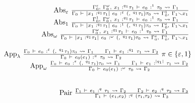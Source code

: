 \[\begin{array}{r}
{\text{Abs}_{\varepsilon}\ \frac{\text{\quad\quad}{\Gamma_{0}^{\varepsilon}{,\ }\Gamma_{0}^{\omega}{,\ }{x_{1}\text{ :}^{q_{1}}\tau_{1}}\  \vdash \ e_{0}\ :^{1}\ \tau_{0}\  \rightsquigarrow \ \Gamma_{1}}}{\Gamma_{0}\  \vdash \ {|{x_{1}\text{ :}^{q_{1}}\tau_{1}}|\ e_{0}}\ :^{\varepsilon}\ {({,\ }{{}^{q_{1}}\tau_{1}})\tau_{0}}\  \rightsquigarrow \ \Gamma_{0}^{1}{,\ }\Gamma_{1} \smallsetminus x_{1}}\ } \\
{\text{Abs}_{1}\ \frac{\text{\quad\quad}{\Gamma_{0}^{1}{,\ }\Gamma_{0}^{\omega}{,\ }{x_{1}\text{ :}^{q_{1}}\tau_{1}}\  \vdash \ e_{0}\ :^{1}\ \tau_{0}\  \rightsquigarrow \ \Gamma_{1}}}{\Gamma_{0}\  \vdash \ {|{x_{1}\text{ :}^{q_{1}}\tau_{1}}|\ e_{0}}\ :^{1}\ {({,\ }{{}^{q_{1}}\tau_{1}})\tau_{0}}\  \rightsquigarrow \ \Gamma_{0}^{\varepsilon}{,\ }\Gamma_{1} \smallsetminus x_{1}}\ } \\
{\text{Abs}_{\omega}\ \frac{\text{\quad\quad}{\Gamma_{0}^{\omega}{,\ }{x_{1}\text{ :}^{q_{1}}\tau_{1}}\  \vdash \ e_{0}\ :^{1}\ \tau_{0}\  \rightsquigarrow \ \Gamma_{1}}}{\Gamma_{0}\  \vdash \ {|{x_{1}\text{ :}^{q_{1}}\tau_{1}}|\ e_{0}}\ :^{\omega}\ {({,\ }{{}^{q_{1}}\tau_{1}})\tau_{0}}\  \rightsquigarrow \ \Gamma_{0}^{\varepsilon}{,\ }\Gamma_{0}^{1}{,\ }\Gamma_{1} \smallsetminus x_{1}}\ } \\
 \\
{\text{App}_{\lambda}\ \frac{{\Gamma_{0}\  \vdash \ e_{0}\ :^{\varepsilon}\ {({,\ }{{}^{q_{1}}\tau_{1}})\tau_{0}}\  \rightsquigarrow \ \Gamma_{1}}\text{\quad\quad}{\Gamma_{1}\  \vdash \ e_{1}\ :^{q_{1}}\ \tau_{1}\  \rightsquigarrow \ \Gamma_{2}}}{\Gamma_{0}\  \vdash \ {e_{0}(e_{1})}\ :^{\pi}\ \tau_{0}\  \rightsquigarrow \ \Gamma_{2}}\ \pi \in \left\{ \varepsilon,1 \right\}} \\
{\text{App}_{\omega}\ \frac{{\Gamma_{0}\  \vdash \ e_{0}\ :^{\varepsilon}\ {({,\ }{{}^{q_{1}}\tau_{1}})\tau_{0}}\  \rightsquigarrow \ \Gamma_{1}}\text{\quad\quad}{\Gamma_{1}\  \vdash \ e_{1}\ :^{\left| q_{1} \right|}\ \tau_{1}\  \rightsquigarrow \ \Gamma_{2}}}{\Gamma_{0}\  \vdash \ {e_{0}(e_{1})}\ :^{\omega}\ \tau_{0}\  \rightsquigarrow \ \Gamma_{2}}\ } \\
 \\
 \\
{\text{Pair}\ \frac{{\Gamma_{1}\  \vdash \ e_{1}\ :^{q}\ \tau_{1}\  \rightsquigarrow \ \Gamma_{2}}\text{\quad\quad}{\Gamma_{2}\  \vdash \ e_{2}\ :^{q}\ \tau_{2}\  \rightsquigarrow \ \Gamma_{3}}}{\Gamma_{1}\  \vdash \ {(e_{1},e_{2})}\ :^{q}\ {(\tau_{1},\tau_{2})}\  \rightsquigarrow \ \Gamma_{3}}\ } \\

\end{array}\]
